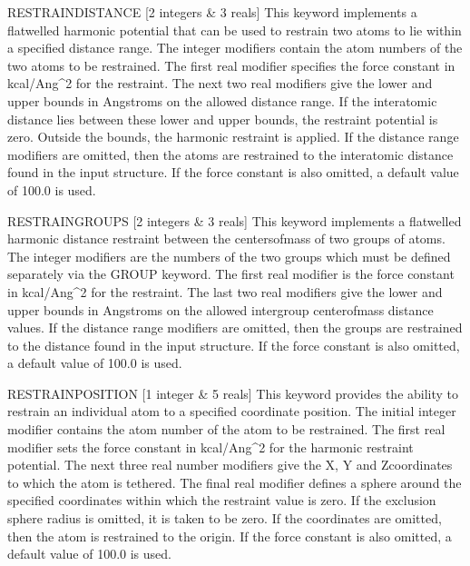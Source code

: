 \documentclass[letterpaper,11pt,english]{sphinxmanual}
\begin{document}
RESTRAIN\sphinxhyphen{}DISTANCE {[}2 integers \& 3 reals{]}     This keyword implements a flat\sphinxhyphen{}welled harmonic potential that can be used to restrain two atoms to lie within a specified distance range. The integer modifiers contain the atom numbers of the two atoms to be restrained. The first real modifier specifies the force constant in kcal/Ang\textasciicircum{}2 for the restraint. The next two real modifiers give the lower and upper bounds in Angstroms on the allowed distance range. If the interatomic distance lies between these lower and upper bounds, the restraint potential is zero. Outside the bounds, the harmonic restraint is applied. If the distance range modifiers are omitted, then the atoms are restrained to the interatomic distance found in the input structure. If the force constant is also omitted, a default value of 100.0 is used.

RESTRAIN\sphinxhyphen{}GROUPS {[}2 integers \& 3 reals{]}     This keyword implements a flat\sphinxhyphen{}welled harmonic distance restraint between the centers\sphinxhyphen{}of\sphinxhyphen{}mass of two groups of atoms. The integer modifiers are the numbers of the two groups which must be defined separately via the GROUP keyword. The first real modifier is the force constant in kcal/Ang\textasciicircum{}2 for the restraint. The last two real modifiers give the lower and upper bounds in Angstroms on the allowed intergroup center\sphinxhyphen{}of\sphinxhyphen{}mass distance values. If the distance range modifiers are omitted, then the groups are restrained to the distance found in the input structure. If the force constant is also omitted, a default value of 100.0 is used.

RESTRAIN\sphinxhyphen{}POSITION {[}1 integer \& 5 reals{]}     This keyword provides the ability to restrain an individual atom to a specified coordinate position. The initial integer modifier contains the atom number of the atom to be restrained. The first real modifier sets the force constant in kcal/Ang\textasciicircum{}2 for the harmonic restraint potential. The next three real number modifiers give the X\sphinxhyphen{}, Y\sphinxhyphen{} and Z\sphinxhyphen{}coordinates to which the atom is tethered. The final real modifier defines a sphere around the specified coordinates within which the restraint value is zero. If the exclusion sphere radius is omitted, it is taken to be zero. If  the coordinates are omitted, then the atom is restrained to the origin. If the force constant is also omitted, a default value of 100.0 is used.
\end{document}
